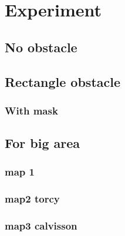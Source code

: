    
		
\section{Experiment}
	\subsection{No obstacle }
	\subsection{Rectangle obstacle}
	\subsubsection{With mask}
	\subsection{For big area}
		\subsubsection{map 1}
		\subsubsection{map2 torcy}
		\subsubsection{map3 calvisson}
		



 


